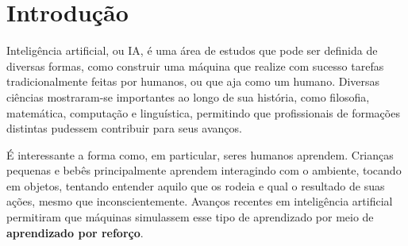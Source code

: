 
\chapter{Introdução}
\label{cap:introducao}

Inteligência artificial, ou IA, é uma área de estudos que pode ser definida de diversas formas, como construir uma máquina que realize com sucesso tarefas tradicionalmente feitas por humanos, ou que aja como um humano.
Diversas ciências mostraram-se importantes ao longo de sua história, como filosofia, matemática, computação e linguística, permitindo que profissionais de formações distintas pudessem contribuir para seus avanços.

É interessante a forma como, em particular, seres humanos aprendem.
Crianças pequenas e bebês principalmente aprendem interagindo com o ambiente, tocando em objetos, tentando entender aquilo que os rodeia e qual o resultado de suas ações, mesmo que inconscientemente.
Avanços recentes em inteligência artificial permitiram que máquinas simulassem esse tipo de aprendizado por meio de \textbf{aprendizado por reforço}.

